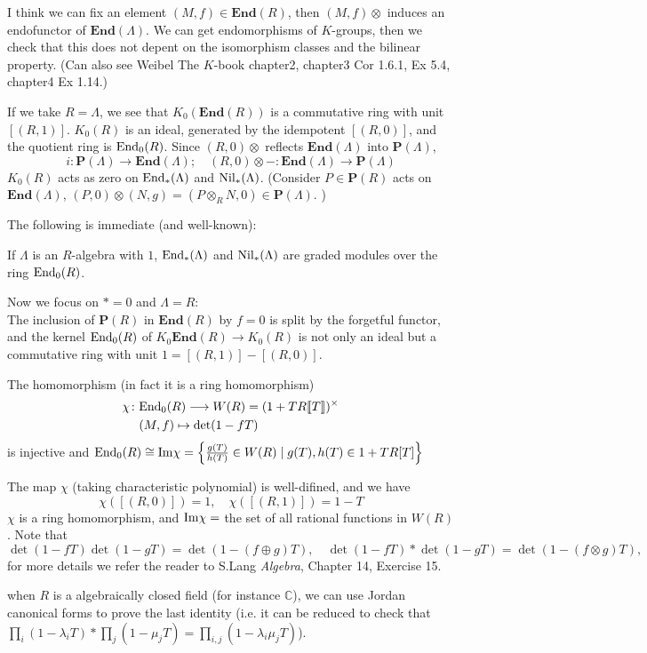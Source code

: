 I think we can fix an element $(M,f)\in \mathbf{End}(R)$, then $(M,f)\otimes$ induces an endofunctor of $\mathbf{End}(\Lambda)$. We can get endomorphisms of $K$-groups, then we check that this does not depent on the isomorphism classes and the bilinear property. (Can also see Weibel The $K$-book chapter2, chapter3 Cor 1.6.1, Ex 5.4, chapter4 Ex 1.14.)

If we take $R = \Lambda$, we see that $K_0(\mathbf{End}(R))$ is a commutative ring with unit $[(R,1)]$. $K_0(R)$ is an
ideal, generated by the idempotent $[(R,0)]$, and the quotient
ring is $\mathrm{End}_0(R)$.  Since $(R,0)\otimes$ reflects $\mathbf{End} (\Lambda)$ into $\mathbf{P} (\Lambda)$,
\[i\colon \mathbf{P} (\Lambda) \longrightarrow \mathbf{End} (\Lambda);\quad
 (R,0)\otimes - \colon \mathbf{End} (\Lambda) \longrightarrow \mathbf{P} (\Lambda)\]
$K_0(R)$ acts as zero on $\mathrm{End}_*(\Lambda)$ and $\mathrm{Nil}_*(\Lambda)$. (Consider $P\in \mathbf{P}(R)$ acts on $\mathbf{End}(\Lambda)$, $(P,0)\otimes (N,g)=(P\otimes_R N,0) \in \mathbf{P}(\Lambda)$. )

The following is immediate (and well-known):
\begin{prop}\label{endmodule}
	If  $\Lambda$ is an $R$-algebra with $1$, $\mathrm{End}_*(\Lambda)$ and
$\mathrm{Nil}_*(\Lambda)$ are graded modules over the ring $\mathrm{End}_0 (R)$.
\end{prop}
Now we focus on $*=0$ and $\Lambda =R$:\\

The inclusion of $\mathbf{P}(R)$ in $\mathbf{End}(R)$ by $f = 0$ is split by the forgetful functor, and the kernel $\mathrm{End}_0 (R)$ of $K_0\mathbf{End}(R) \longrightarrow K_0 (R)$ is not only an ideal but a commutative ring with unit $1 = [(R,1)] - [(R, 0)]$.

\begin{theorem}[Almkvist]\label{Almkvist}
The homomorphism (in fact it is a ring homomorphism)
\begin{align*}
	\chi \colon&  \mathrm{End}_0(R)\longrightarrow W(R)=(1+TR\llbracket T\rrbracket )^{\times}\\
     & (M,f) \mapsto \det(1-fT)
\end{align*}
	is injective and $\mathrm{End}_0(R)\cong \mathrm{Im} \chi =\left\{\frac{g(T)}{h(T)}\in W(R)\mid g(T),h(T) \in 1+TR[T]\right\}$
\end{theorem}
The map $\chi$ (taking characteristic polynomial) is well-difined, and we have 
\[\chi([(R,0)])=1, \quad \chi([(R,1)])=1-T\]
$\chi$ is a ring homomorphism, and $\mathrm{Im} \chi =$ the set of all rational functions in $W(R)$. Note that 
\[\det (1-fT)\det(1-gT)=\det(1-(f\oplus g)T),\quad \det (1-fT)*\det(1-gT)=\det(1-(f\otimes g)T),\]
for more details we refer the reader to S.Lang {\em Algebra}, Chapter 14, Exercise 15.
\begin{remark}
	when $R$ is a algebraically closed field (for instance $\mathbb{C}$), we can use Jordan canonical forms to prove the last identity (i.e. it can be reduced to check that $\prod_i (1-\lambda_i T) * \prod_j (1-\mu_j T) =\prod_{i,j} (1-\lambda_i \mu_j T)$).
\end{remark}


